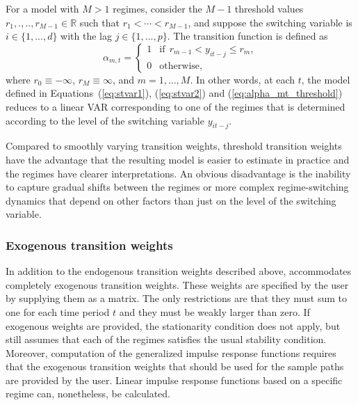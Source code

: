 \documentclass[nojss]{jss}
\begin{document}
For a model with $M>1$ regimes, consider the $M-1$ threshold values $r_1,.,..,r_{M - 1}\in\mathbb{R}$ such that $r_1<\cdots<r_{M-1}$, and suppose the switching variable is $i\in \lbrace 1,...,d \rbrace$ with the lag $j\in \lbrace 1,...,p \rbrace$. The transition function is defined as
\begin{equation}\label{eq:alpha_mt_threshold}
\alpha_{m,t} =
\left\lbrace\begin{matrix}
1 & \text{if} \ \ r_{m-1} < y_{it-j} \leq r_{m}, \\
0 & \text{otherwise}, \phantom{aaaaaaaaa}
\end{matrix}\right.
\end{equation}
where $r_0\equiv-\infty$, $r_M\equiv\infty$, and $m=1,...,M$. In other words, at each $t$‚ the model defined in Equations~(\ref{eq:stvar1}), (\ref{eq:stvar2}) and (\ref{eq:alpha_mt_threshold}) reduces to a linear VAR corresponding to one of the regimes that is determined according to the level of the switching variable $y_{it-j}$.

Compared to smoothly varying transition weights, threshold transition weights have the advantage that the resulting model is easier to estimate in practice and the regimes have clearer interpretations. An obvious disadvantage is the inability to capture gradual shifts between the regimes or more complex regime-switching dynamics that depend on other factors than just on the level of the switching variable.

\subsubsection{Exogenous transition weights}

In addition to the endogenous transition weights described above,  accommodates completely exogenous transition weights. These weights are specified by the user by supplying them as a matrix. The only restrictions are that they must sum to one for each time period $t$ and they must be weakly larger than zero. If exogenous weights are provided, the stationarity condition does not apply, but  still assumes that each of the regimes satisfies the usual stability condition. Moreover, computation of the generalized impulse response functions requires that the exogenous transition weights that should be used for the sample paths are provided by the user. Linear impulse response functions based on a specific regime can, nonetheless, be calculated.
\end{document}
